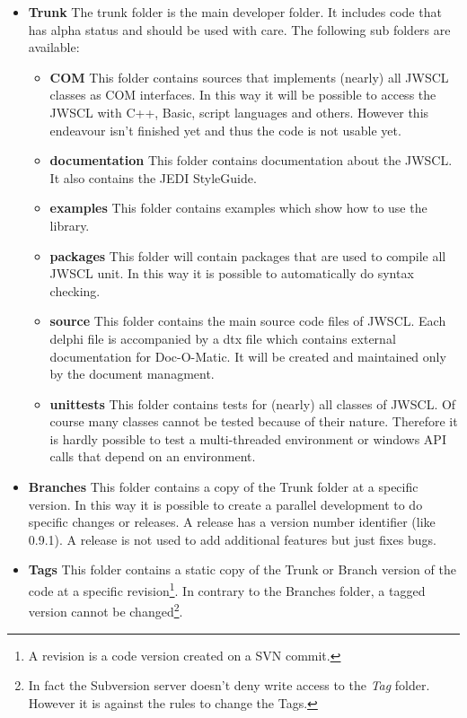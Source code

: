 \documentclass[a4paper,oneside,10pt]{article}
\begin{document}
\begin{itemize}
	\item \textbf{Trunk} The trunk folder is the main developer folder. It includes code that has alpha status and should be used with care. The following sub folders are available:
	  
		\begin{itemize}
			\item \textbf{COM} This folder contains sources that implements (nearly) all JWSCL classes as COM interfaces. In this way it will be possible to access the JWSCL with C++, Basic, script languages and others. However this endeavour isn't finished yet and thus the code is not usable yet.
			\item \textbf{documentation} This folder contains documentation about the JWSCL. It also contains the JEDI StyleGuide.
			\item \textbf{examples} This folder contains examples which show how to use the library. 
			\item \textbf{packages} This folder will contain packages that are used to compile all JWSCL unit. In this way it is possible to automatically do syntax checking.
			\item \textbf{source} This folder contains the main source code files of JWSCL. Each delphi file is accompanied by a dtx file which contains external documentation for Doc-O-Matic. It will be created and maintained only by the document managment.
			\item \textbf{unittests} This folder contains tests for (nearly) all classes of JWSCL. Of course many classes cannot be tested because of their nature. Therefore it is hardly possible to test a multi-threaded environment or windows API calls that depend on an environment.
		\end{itemize}
	\item \textbf{Branches} This folder contains a copy of the Trunk folder at a specific version. In this way it is possible to create a parallel development to do specific changes or releases. A release has a version number identifier (like 0.9.1). A release is not used to add additional features but just fixes bugs.
	\item \textbf{Tags} This folder contains a static copy of the Trunk or Branch version of the code at a specific revision\footnote{A revision is a code version created on a SVN commit.}. In contrary to the Branches folder, a tagged version cannot be changed\footnote{In fact the Subversion server doesn't deny write access to the \textit{Tag} folder. However it is against the rules to change the Tags.}. 
\end{itemize}
\end{document}
